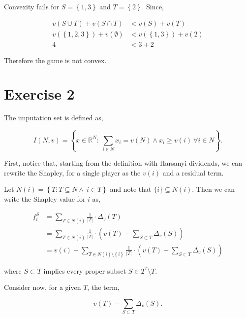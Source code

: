\documentclass[american]{scrartcl}
\newcommand{\set}[1]{\left\{#1\right\}}
\newcommand{\Real}{\mathbb{R}}
\newcommand{\abs}[1]{\left\lvert #1 \right\rvert}
\begin{document}
Convexity fails for $S = \set{1, 3}$ and $T = \set{2}$. Since,

\begin{equation}
    \begin{split}
        v\left(S \cup T\right) + v\left(S \cap T\right) &< v(S) + v(T)\\
        v(\set{1, 2, 3}) + v(\emptyset) &< v(\set{1, 3}) + v(2) \\
        4 &< 3 + 2
    \end{split}
\end{equation}

Therefore the game is not convex.

\section*{Exercise 2}

The imputation set is defined as,

\begin{equation}
    I(N, v) = \set{ x \in \Real^N: \ \sum_{i \in N} x_i = v(N) \land x_i \geq v(i) \ \forall i \in N }.
\end{equation}

First, notice that, starting from the definition with Harsanyi dividends, we can rewrite the Shapley, for a single player as the $v(i)$ and a residual term.

Let $N(i) = \set{T: T \subseteq N \land \ i \in T}$ and note that $\{i\} \subseteq N(i)$. Then we can write the Shapley value for $i$ as,

\begin{equation}
    \begin{split}
        f^S_i &= \sum_{T \in N(i)} \frac{1}{\abs{T}} \cdot \Delta_v(T)\\
        &=  \sum_{T \in N(i)} \frac{1}{\abs{T}} \cdot \left( v(T) - \sum_{S \subset T} \Delta_v(S) \right) \\
        &= v(i) + \sum_{T \in N(i) \setminus \set{i} } \frac{1}{\abs{T}} \cdot \left( v(T) - \sum_{S \subset T} \Delta_v(S) \right)
    \end{split}
\end{equation}

where $S \subset T$ implies every proper subset $S \in 2^T \setminus T$.

Consider now, for a given $T$, the term,

\begin{equation} \label{diff}
    v(T) - \sum_{S \subset T} \Delta_v(S).
\end{equation}
\end{document}
